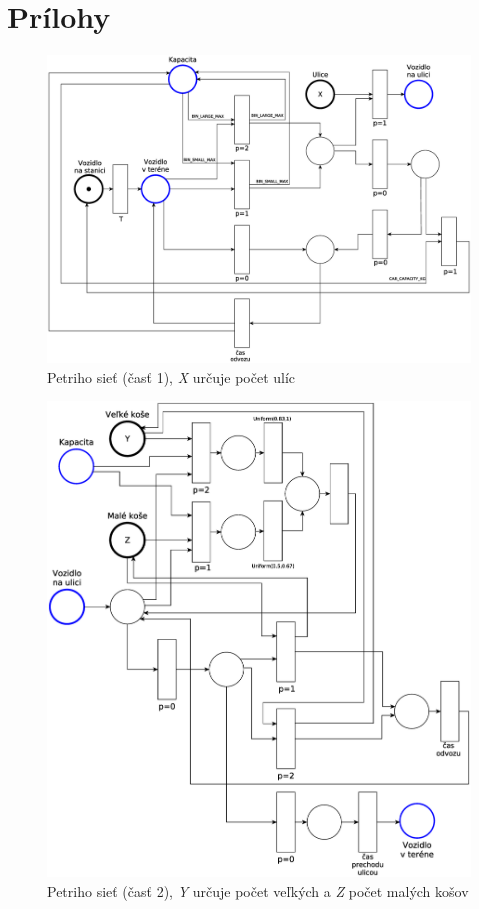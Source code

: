 \documentclass[11pt,a4paper]{article}
\begin{document}
\newpage
\section{Prílohy}

\begin{figure}[h]
    \center
    \includegraphics[scale=0.35]{../pn/pn-part1.eps}
    \caption{Petriho sieť (časť 1), \textit{X} určuje počet ulíc}
    \label{PN-P1}
\end{figure}

\begin{figure}[H]
    \center
    \includegraphics[scale=0.4]{../pn/pn-part2.eps}
    \caption{Petriho sieť (časť 2), \textit{Y} určuje počet veľkých a \textit{Z} počet malých košov}
    \label{PN-P2}
\end{figure}

\newpage %

\makeatletter
\makeatother

\begin{flushleft}
    
\end{flushleft}
\end{document}

